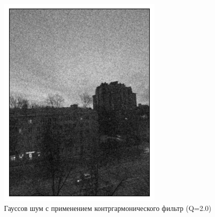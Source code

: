\documentclass[a4paper,12pt]{article}
\begin{document}
\begin{figure}[H]
    \begin{minipage}{0.49\textwidth}
        \centering \includegraphics[width=\textwidth]{results/lpf_gaus_4.png}
        \caption{Гауссов шум с применением контргармонического фильтр (Q=2.0)}
    \end{minipage}\hfill
    \begin{minipage}{0.49\textwidth}

\end{minipage}
\end{figure}
\end{document}
